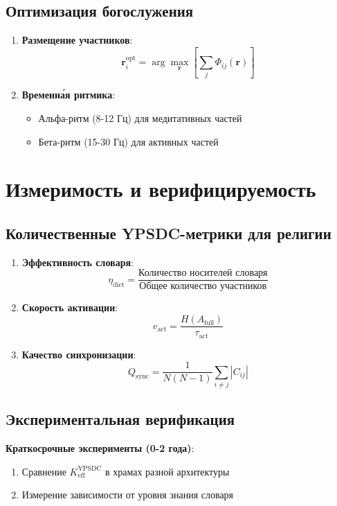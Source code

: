 \documentclass[12pt,a4paper]{article}
\begin{document}
	\subsection{Оптимизация богослужения}
	
	\begin{enumerate}
		\item \textbf{Размещение участников}:
		\[
		\mathbf{r}_i^{\mathrm{opt}} = \arg\max_{\mathbf{r}} \left[\sum_j \Phi_{ij}(\mathbf{r})\right]
		\]
		\item \textbf{Временна́я ритмика}:
		\begin{itemize}
			\item Альфа-ритм (8-12 Гц) для медитативных частей
			\item Бета-ритм (15-30 Гц) для активных частей
		\end{itemize}
	\end{enumerate}
	
	\section{Измеримость и верифицируемость}
	
	\subsection{Количественные YPSDC-метрики для религии}
	
	\begin{enumerate}
		\item \textbf{Эффективность словаря}:
		\[
		\eta_{\mathrm{dict}} = \frac{\text{Количество носителей словаря}}{\text{Общее количество участников}}
		\]
		\item \textbf{Скорость активации}:
		\[
		v_{\mathrm{act}} = \frac{H(A_{\mathrm{full}})}{\tau_{\mathrm{act}}}
		\]
		\item \textbf{Качество синхронизации}:
		\[
		Q_{\mathrm{sync}} = \frac{1}{N(N-1)} \sum_{i \neq j} |C_{ij}|
		\]
	\end{enumerate}
	
	\subsection{Экспериментальная верификация}
	
	\textbf{Краткосрочные эксперименты (0-2 года)}:
	\begin{enumerate}
		\item Сравнение $K_{\mathrm{eff}}^{\mathrm{YPSDC}}$ в храмах разной архитектуры
		\item Измерение зависимости от уровня знания словаря
	\end{enumerate}
	
\end{document}
